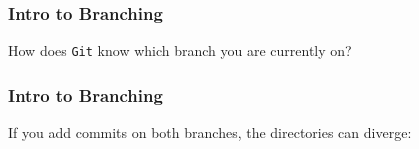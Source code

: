 \documentclass{beamer}
\begin{document}
\begin{frame}
\frametitle{Intro to Branching}
How does \texttt{Git} know which branch you are currently on? 
\begin{center}

\end{center}
\end{frame}

\begin{frame}
\frametitle{Intro to Branching}
If you add commits on both branches, the directories can diverge:
\begin{center}

\end{center}
\end{frame}
\end{document}
